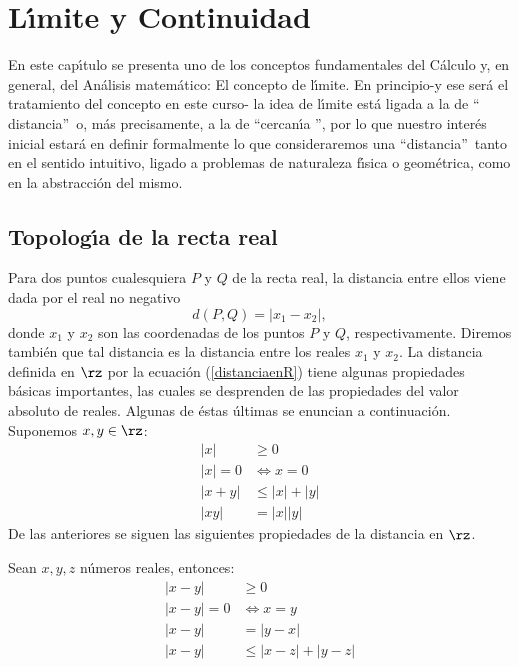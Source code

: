 
\chapter{L\'{\i}mite y Continuidad}

En este cap\'{\i}tulo se presenta uno de los conceptos fundamentales del
C\'{a}lculo y, en general, del An\'{a}lisis matem\'{a}tico: El concepto de
l\'{\i}mite. En principio-y ese ser\'{a} el tratamiento del concepto en este
curso- la idea de l\'{\i}mite est\'{a} ligada a la de \textquotedblleft
distancia\textquotedblright\ o, m\'{a}s precisamente, a la de
\textquotedblleft cercan\'{\i}a \textquotedblright, por lo que nuestro
inter\'{e}s inicial estar\'{a} en definir formalmente lo que consideraremos
una \textquotedblleft distancia\textquotedblright\ tanto en el sentido
intuitivo, ligado a problemas de naturaleza f\'{\i}sica o geom\'{e}trica, como
en la abstracci\'{o}n del mismo.

\section{Topolog\'{\i}a de la recta real}

Para dos puntos cualesquiera $P$ y $Q$ de la recta real, la
%
distancia entre ellos viene dada por el real no negativo
\begin{equation}
d(P,Q)=|x_{1}-x_{2}|, \label{distanciaenR}%
\end{equation}
donde $x_{1}$ y $x_{2}$ son las coordenadas de los puntos $P$ y $Q$,
respectivamente. Diremos tambi\'{e}n que tal distancia es la distancia entre
los reales $x_{1}$ y $x_{2}$. La distancia definida en $\rz$ por la
ecuaci\'{o}n (\ref{distanciaenR}) tiene algunas propiedades b\'{a}sicas
importantes, las cuales se desprenden de las propiedades del valor absoluto de
reales. Algunas de \'{e}stas \'{u}ltimas se enuncian a continuaci\'{o}n.
Suponemos $x,y\in\rz$:
\begin{align}
|x|  &  \geq0\\
|x|=0  &  \Longleftrightarrow x=0\\
|x+y|  &  \leq|x|+|y|\label{triangular1}\\
|xy|  &  =|x||y|
\end{align}
De las anteriores se siguen las siguientes propiedades de la distancia en
$\rz$.%
%


\begin{theorem}
Sean $x,y,z$ n\'{u}meros reales, entonces:
\begin{align}
|x-y|  &  \geq0\label{nonegativa}\\
|x-y|=0  &  \Longleftrightarrow x=y\label{nulidad}\\
|x-y|  &  =|y-x|\label{simetria}\\
|x-y|  &  \leq|x-z|+|y-z| \label{triangular}%
\end{align}

\end{theorem}

